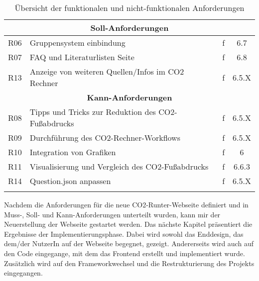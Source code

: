 \begin{longtable}{|c|l|c|c|}
    \multicolumn{4}{|c|}{\textbf{Soll-Anforderungen}}                                      \\ \hline

    R06                  & Gruppensystem einbindung                           & f  & 6.7   \\ \hline
    R07                  & FAQ und Literaturlisten Seite                      & f  & 6.8   \\ \hline
    R13                  & Anzeige von weiteren Quellen/Infos im CO2 Rechner  & f  & 6.5.X \\ \hline

    \multicolumn{4}{|c|}{\textbf{Kann-Anforderungen}}                                      \\ \hline

    R08                  & Tipps und Tricks zur Reduktion des CO2-Fußabdrucks & f  & 6.5.X \\ \hline
    R09                  & Durchführung des CO2-Rechner-Workflows             & f  & 6.5.X \\ \hline
    R10                  & Integration von Grafiken                           & f  & 6     \\ \hline
    R11                  & Visualisierung und Vergleich des CO2-Fußabdrucks   & f  & 6.6.3 \\ \hline
    R14                  & Question.json anpassen                             & f  & 6.5.X \\ \hline
    \caption{Übersicht der funktionalen und nicht-funktionalen Anforderungen}
    \label{table:definied-tasks}
\end{longtable}


Nachdem die Anforderungen für die neue CO2-Runter-Webseite definiert und in Muss-, Soll- und Kann-Anforderungen unterteilt wurden, kann mir der Neuerstellung der Webseite gestartet werden.
Das nächste Kapitel präsentiert die Ergebnisse der Implementierungsphase.
Dabei wird sowohl das Enddesign, das dem/der NutzerIn auf der Webseite begegnet, gezeigt. Andererseits wird auch auf den Code eingegange, mit dem das Frontend erstellt und implementiert wurde.
Zusätzlich wird auf den Frameworkwechsel und die Restrukturierung des Projekts eingegangen.
